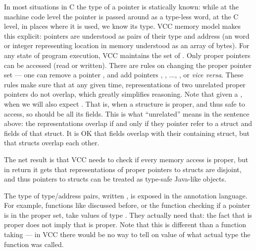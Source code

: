 In most situations in C the type of a pointer is statically known:
while at the machine code level the pointer is passed around as a type-less
word, at the C level, in places where it is used, we know its type.
VCC memory model makes this explicit: pointers are understood as pairs
of their type and address (an word or integer representing location in memory
understood as an array of bytes).
For any state of program execution, VCC maintains the set of .
Only proper pointers can be accessed (read or written).
There are rules on changing the proper pointer set --- \eg one can remove
a pointer , and add pointers , ,
..., , or \emph{vice versa}.
These rules make sure that at any given time, representations of two
unrelated proper pointers do not overlap, which greatly simplifies reasoning.
Note that given a , when 
we will also expect .
That is, when a structure is proper, and thus safe to access, so should
be all its fields.
This is what ``unrelated'' means in the sentence above:
the representations overlap if and only if they pointer refer to a struct
and fields of that struct.
It is OK that fields overlap with their containing struct, but that
structs overlap each other.

The net result is that VCC needs to check if every memory access is proper,
but in return it gets that representations of proper pointers to structs
are disjoint, and thus pointers to structs can be treated as type-safe
Java-like objects.

The type of type/address pairs, written \vcc{\object}, is exposed in the annotation
language.
For example, functions like  discussed before,
or the function \vcc{\proper()} checking if a pointer is in the proper set,
take values of type \vcc{\object}.
They actually need that:
the fact that  is proper
does not imply that  is proper.
Note that this is different than a function taking  --- in
VCC there would be no way to tell on value of what actual type the function was called.


